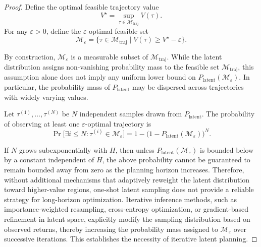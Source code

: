 \begin{proof}
Define the optimal feasible trajectory value
\[
V^\star = \sup_{\tau \in \mathcal{M}_{\mathrm{traj}}} V(\tau).
\]
For any $\varepsilon > 0$, define the $\varepsilon$-optimal feasible set
\[
\mathcal{M}_\varepsilon
=
\{\tau \in \mathcal{M}_{\mathrm{traj}} \mid V(\tau) \ge V^\star - \varepsilon\}.
\]

By construction, $\mathcal{M}_\varepsilon$ is a measurable subset of
$\mathcal{M}_{\mathrm{traj}}$.
While the latent distribution assigns non-vanishing probability mass
to the feasible set $\mathcal{M}_{\mathrm{traj}}$,
this assumption alone does not imply any uniform lower bound on
$P_{\mathrm{latent}}(\mathcal{M}_\varepsilon)$.
In particular, the probability mass of $P_{\mathrm{latent}}$
may be dispersed across trajectories with widely varying values.

Let $\tau^{(1)}, \ldots, \tau^{(N)}$ be $N$ independent samples
drawn from $P_{\mathrm{latent}}$.
The probability of observing at least one $\varepsilon$-optimal trajectory is
\[
\Pr\Big[\exists i \le N : \tau^{(i)} \in \mathcal{M}_\varepsilon \Big]
=
1 - \big(1 - P_{\mathrm{latent}}(\mathcal{M}_\varepsilon)\big)^N.
\]

If $N$ grows subexponentially with $H$,
then unless $P_{\mathrm{latent}}(\mathcal{M}_\varepsilon)$
is bounded below by a constant independent of $H$,
the above probability cannot be guaranteed to remain bounded away from zero
as the planning horizon increases.
Therefore, without additional mechanisms that adaptively reweight
the latent distribution toward higher-value regions,
one-shot latent sampling does not provide a reliable strategy
for long-horizon optimization.
Iterative inference methods, such as importance-weighted resampling,
cross-entropy optimization, or gradient-based refinement in latent space, 
explicitly modify the sampling distribution based on observed returns,
thereby increasing the probability mass assigned to $\mathcal{M}_\varepsilon$
over successive iterations.
This establishes the necessity of iterative latent planning.
\end{proof}

